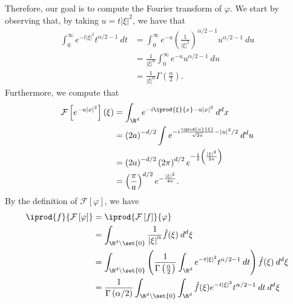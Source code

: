 \documentclass[10pt]{mypackage}
\begin{document}
\begin{example}
  Therefore, our goal is to compute the Fourier transform of $\varphi$. We start by observing that, by taking $u = t \left\vert \xi \right\vert^2$, we have that
  \begin{align*}
    \int_{0}^{\infty} e^{-t\left\vert \xi \right\vert^2} t^{\alpha/2-1}\:dt &= \int_{0}^{\infty} e^{-u}\left( \frac{1}{\left\vert \xi \right\vert^2} \right)^{\alpha/2-1}u^{\alpha/2-1}\:du\\
                                                                            &= \frac{1}{\left\vert \xi \right\vert^{\alpha}} \int_{0}^{\infty} e^{-u}u^{\alpha/2-1}\:du\\
                                                                            &= \frac{1}{\left\vert \xi \right\vert^{\alpha}}\Gamma\left( \frac{\alpha}{2} \right).
  \end{align*}
  Furthermore, we compute that
  \begin{align*}
    \mathcal{F}\left[ e^{-a \left\vert x \right\vert^2} \right]\left( \xi \right) &= \int_{\R^d}^{} e^{-i \iprod{\xi}{x} - a\left\vert x \right\vert^2}\:d^{d}x\\
                                                           &= \left( 2a \right)^{-d/2}\int_{}^{} e^{-i \frac{\iprod{u}{\xi}}{\sqrt{2a}} - \left\vert u \right\vert^2/2}\:d^{d}u\\
                                                           &= \left( 2a \right)^{-d/2} \left( 2\pi \right)^{d/2} e^{- \frac{1}{2}\left( \frac{\left\vert \xi \right\vert^2}{2a} \right)}\\
                                                           &= \left( \frac{\pi}{a} \right)^{d/2} e^{- \frac{\left\vert \xi \right\vert^2}{4a}}.
  \end{align*}
  By the definition of $\mathcal{F}\left[ \varphi \right]$, we have
  \begin{align*}
    \iprod{f}{\mathcal{F}\left[ \varphi \right]} &= \iprod{\mathcal{F}\left[ f \right]}{\varphi}\\
               &= \int_{\R^d\setminus \set{0}}^{} \frac{1}{\left\vert \xi \right\vert^{\alpha}}\hat{f}(\xi)\:d^{d}\xi\\
               &= \int_{\R^d\setminus\set{0}}^{} \left( \frac{1}{\Gamma\left( \frac{\alpha}{2} \right)} \int_{\R^d}^{} e^{-t\left\vert \xi \right\vert^2}t^{\alpha/2 - 1}\:dt \right)\hat{f}(\xi)\:d^{d}\xi\\
               &= \frac{1}{\Gamma\left( \alpha/2 \right)}\int_{\R^d\setminus\set{0}}^{} \int_{\R^d}^{} \hat{f}(\xi)e^{-t\left\vert \xi \right\vert^2}t^{\alpha/2-1}\:dt\:d^{d}\xi

\end{align*}
\end{example}
\end{document}
